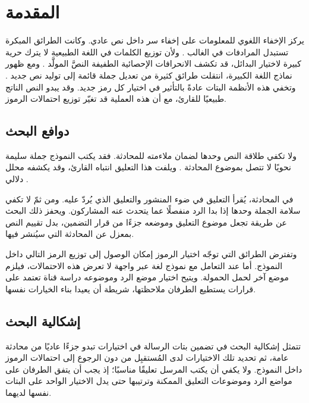 \section{المقدمة}
\label{sec:introduction}

يركز الإخفاء اللغوي للمعلومات على إخفاء سر داخل نص عادي.
وكانت الطرائق المبكرة تستبدل المرادفات في الغالب \cite{qiang2023natural}.
ولأن توزيع الكلمات في اللغة الطبيعية لا يترك حرية كبيرة لاختيار البدائل، قد تكشف الانحرافات الإحصائية الطفيفة النصَّ المولَّد \cite{yang2020vae,kaptchuk2021meteor,Wang_2023}.
ومع ظهور نماذج اللغة الكبيرة، انتقلت طرائق كثيرة من تعديل جملة قائمة إلى توليد نص جديد \cite{li2023rewriting,lin2024zero,wu2024generative}.
وتخفي هذه الأنظمة البتات عادةً بالتأثير في اختيار كل رمز جديد. وقد يبدو النص الناتج طبيعيًا للقارئ، مع أن هذه العملية قد تغيّر توزيع احتمالات الرموز.

\subsection{دوافع البحث}

ولا تكفي طلاقة النص وحدها لضمان ملاءمته للمحادثة.
فقد يكتب النموذج جملة سليمة نحويًا لا تتصل بموضوع المحادثة \cite{liao2024co,wang2023hi,zhang2024controllable}.
ويلفت هذا التعليق انتباه القارئ، وقد يكشفه محلل دلالي \cite{olabi2026slr}.

في المحادثة، يُقرأ التعليق في ضوء المنشور والتعليق الذي يُردّ عليه.
ومن ثمّ لا تكفي سلامة الجملة وحدها إذا بدا الرد منفصلًا عما يتحدث عنه المشاركون.
ويحفز ذلك البحث عن طريقة تجعل موضوع التعليق وموضعه جزءًا من قرار التضمين، بدل تقييم النص بمعزل عن المحادثة التي سيُنشر فيها.

وتفترض الطرائق التي توجّه اختيار الرموز إمكان الوصول إلى توزيع الرمز التالي داخل النموذج.
أما عند التعامل مع نموذج لغة عبر واجهة لا تعرض هذه الاحتمالات، فيلزم موضع آخر لحمل الحمولة.
ويتيح اختيار موضع الرد وموضوعه دراسة قناة تعتمد على قرارات يستطيع الطرفان ملاحظتها، شريطة أن يعيدا بناء الخيارات نفسها.

\subsection{إشكالية البحث}

تتمثل إشكالية البحث في تضمين بتات الرسالة في اختيارات تبدو جزءًا عاديًا من محادثة عامة، ثم تحديد تلك الاختيارات لدى المُستقبِل من دون الرجوع إلى احتمالات الرموز داخل النموذج.
ولا يكفي أن يكتب المرسل تعليقًا مناسبًا؛ إذ يجب أن يتفق الطرفان على مواضع الرد وموضوعات التعليق الممكنة وترتيبها حتى يدل الاختيار الواحد على البتات نفسها لديهما.

